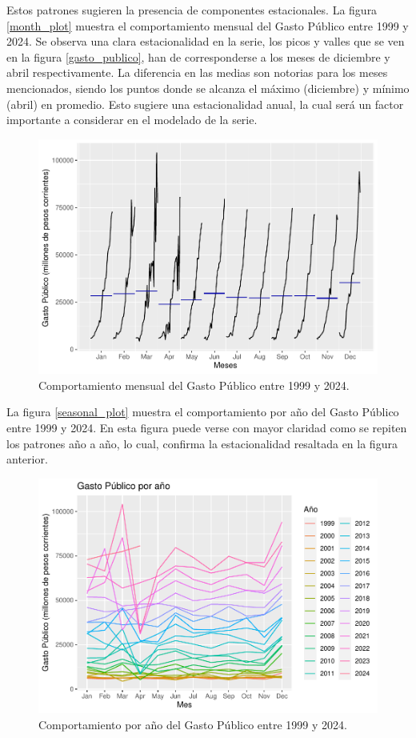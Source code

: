 \documentclass[
  12pt,
]{article}
\begin{document}
Estos patrones sugieren la presencia de componentes estacionales. La
figura \ref{month_plot} muestra el comportamiento mensual del Gasto
Público entre 1999 y 2024. Se observa una clara estacionalidad en la
serie, los picos y valles que se ven en la figura \ref{gasto_publico},
han de corresponderse a los meses de diciembre y abril respectivamente.
La diferencia en las medias son notorias para los meses mencionados,
siendo los puntos donde se alcanza el máximo (diciembre) y mínimo
(abril) en promedio. Esto sugiere una estacionalidad anual, la cual será
un factor importante a considerar en el modelado de la serie.

\begin{figure}[H]

{\centering \includegraphics[width=0.75\linewidth]{informe_files/figure-latex/month_plot-1} 

}

\caption{\label{month_plot} Comportamiento mensual del Gasto Público entre 1999 y 2024.}\label{fig:month_plot}
\end{figure}

La figura \ref{seasonal_plot} muestra el comportamiento por año del
Gasto Público entre 1999 y 2024. En esta figura puede verse con mayor
claridad como se repiten los patrones año a año, lo cual, confirma la
estacionalidad resaltada en la figura anterior.

\begin{figure}[H]

{\centering \includegraphics[width=0.75\linewidth]{informe_files/figure-latex/season_plot-1} 

}

\caption{\label{seasonal_plot} Comportamiento por año del Gasto Público entre 1999 y 2024.}\label{fig:season_plot}
\end{figure}
\end{document}
